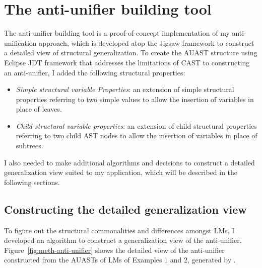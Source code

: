 \section{The anti-unifier building tool} \label{antiunifierTool}
The anti-unifier building tool is a proof-of-concept implementation of my anti-unification approach, which is developed atop the Jigsaw framework to construct a detailed view of structural generalization. To create the AUAST structure using Eclipse JDT framework that addresses the limitations of CAST to constructing an anti-unifier, I added the following structural properties:
\begin{itemize} [leftmargin=.5in]
\item \textit{Simple structural variable Properties}: an extension of simple structural properties referring to two simple values to allow the insertion of variables in place of leaves.
\end{itemize}
\begin{itemize} [leftmargin=.5in]
\item \textit{Child structural variable properties}: an extension of child structural properties referring to two child AST nodes to allow the insertion of variables in place of subtrees.
\end{itemize}

I also needed to make additional algorithms and decisions to construct a detailed generalization view suited to my application, which will be described in the following sections.



\subsection{Constructing the detailed generalization view} \label{meth-detailed-view}

To figure out the structural commonalities and differences amongst LMs, I developed an algorithm to construct a generalization view of the anti-unifier. Figure~\ref{fig:meth-anti-unifier} shows the detailed view of the anti-unifier constructed from the AUASTs of LMs of Examples 1 and 2, generated by .



